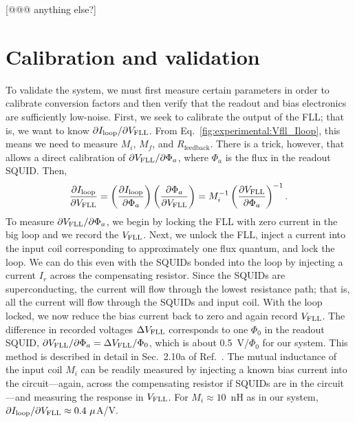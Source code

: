 [@@@ anything else?]


\section{Calibration and validation}

To validate the system, we must first measure certain parameters in order to calibrate conversion factors and then verify that the readout and bias electronics are sufficiently low-noise. First, we seek to calibrate the output of the FLL; that is, we want to know $\partial I_\text{loop}/\partial V_\text{FLL}$. From Eq.~\eqref{fig:experimental:Vfll_Iloop}, this means we need to measure $M_i$, $M_f$, and $R_{\text{feedback}}$. There is a trick, however, that allows a direct calibration of $\partial V_\text{FLL}/\partial\Phi_a$, where $\Phi_a$ is the flux in the readout SQUID. Then,
\begin{align}\label{Eqn:dIloop_dVfll}
\frac{\partial\Iloop}{\partial\Vfll} = \left(\frac{\partial\Iloop}{\partial\Phi_a}\right) \left(\frac{\partial\Phi_a}{\partial\Vfll}\right) %
= M_i^{-1} \left(\frac{\partial\Vfll}{\partial\Phi_a}\right)^{-1}.
\end{align}
To measure $\partial V_\text{FLL}/\partial\Phi_a$, we begin by locking the FLL with zero current in the big loop and we record the $V_\text{FLL}$. Next, we unlock the FLL, inject a current into the input coil corresponding to approximately one flux quantum, and lock the loop. We can do this even with the SQUIDs bonded into the loop by injecting a current $I_r$ across the compensating resistor. Since the SQUIDs are superconducting, the current will flow through the lowest resistance path; that is, all the current will flow through the SQUIDs and input coil. With the loop locked, we now reduce the bias current back to zero and again record $V_\text{FLL}$. The difference in recorded voltages $\Delta V_\text{FLL}$ corresponds to one $\Phi_0$ in the readout SQUID, $\partial V_\text{FLL}/\partial\Phi_a = \Delta V_\text{FLL} / \Phi_0$, which is about 0.5~V/$\Phi_0$ for our system. This method is described in detail in Sec.~2.10a of Ref.~\citep{Wellstood:thesis}. The mutual inductance of the input coil $M_i$ can be readily measured by injecting a known bias current into the circuit---again, across the compensating resistor if SQUIDs are in the circuit---and measuring the response in $V_\text{FLL}$. For $M_i \approx 10$~nH as in our system, $\partial I_\text{loop}/\partial V_\text{FLL} \approx 0.4~\mu$A/V.

